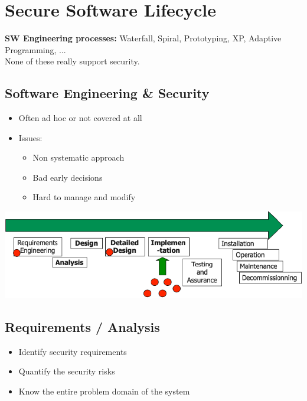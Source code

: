 
\section{Secure Software Lifecycle}
\textbf{SW Engineering processes:} Waterfall, Spiral, Prototyping, XP, Adaptive Programming, ...\\
None of these really support security.\\

\subsection{Software Engineering \& Security}
\begin{itemize}
    \item Often ad hoc or not covered at all
    \item Issues:
    \begin{itemize}
        \item Non systematic approach
        \item Bad early decisions
        \item Hard to manage and modify
    \end{itemize}
\end{itemize}
\includegraphics[width=\linewidth]{../img/sw_engineering_security.png}

\subsection{Requirements / Analysis}
\begin{itemize}
    \item Identify security requirements
    \item Quantify the security risks
    \item Know the entire problem domain of the system
\end{itemize}

